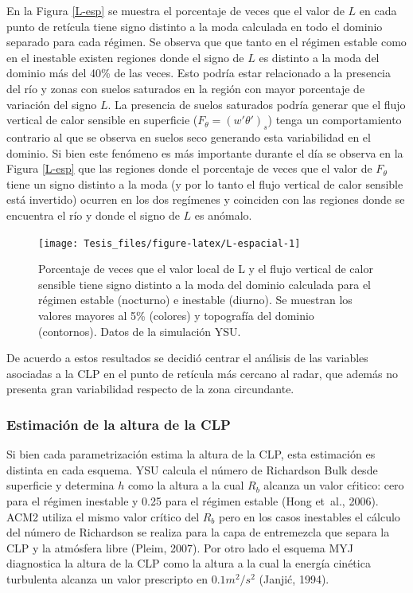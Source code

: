 \documentclass[12pt,spanish,oneside, a4paper]{book}
\begin{document}
En la Figura \ref{L-esp} se muestra el porcentaje de veces que el valor
de \(L\) en cada punto de retícula tiene signo distinto a la moda
calculada en todo el dominio separado para cada régimen. Se observa que
que tanto en el régimen estable como en el inestable existen regiones
donde el signo de \(L\) es distinto a la moda del dominio más del 40\%
de las veces. Esto podría estar relacionado a la presencia del río y
zonas con suelos saturados en la región con mayor porcentaje de
variación del signo \(L\). La presencia de suelos saturados podría
generar que el flujo vertical de calor sensible en superficie
(\(F_{\theta} = (w'\theta ')_s\)) tenga un comportamiento contrario al
que se observa en suelos seco generando esta variabilidad en el dominio.
Si bien este fenómeno es más importante durante el día se observa en la
Figura \ref{L-esp} que las regiones donde el porcentaje de veces que el
valor de \(F_{\theta}\) tiene un signo distinto a la moda (y por lo
tanto el flujo vertical de calor sensible está invertido) ocurren en los
dos regímenes y coinciden con las regiones donde se encuentra el río y
donde el signo de \(L\) es anómalo.

\begin{figure}

{\centering \texttt{[image: Tesis\_files/figure-latex/L-espacial-1]} 

}

\caption{Porcentaje de veces que el valor local de L y el flujo vertical de calor sensible tiene signo distinto a la moda del dominio calculada para el régimen estable (nocturno) e inestable (diurno). Se muestran los valores mayores al 5\% (colores) y topografía del dominio (contornos). Datos de la simulación YSU. \label{L-esp}}\label{fig:L-espacial}
\end{figure}

De acuerdo a estos resultados se decidió centrar el análisis de las
variables asociadas a la CLP en el punto de retícula más cercano al
radar, que además no presenta gran variabilidad respecto de la zona
circundante.

\subsubsection{Estimación de la altura de la
CLP}\label{estimacion-de-la-altura-de-la-clp}

Si bien cada parametrización estima la altura de la CLP, esta estimación
es distinta en cada esquema. YSU calcula el número de Richardson Bulk
desde superficie y determina \(h\) como la altura a la cual \(R_b\)
alcanza un valor cŕitico: cero para el régimen inestable y 0.25 para el
régimen estable (Hong et~al., 2006). ACM2 utiliza el mismo valor crítico
del \(R_b\) pero en los casos inestables el cálculo del número de
Richardson se realiza para la capa de entremezcla que separa la CLP y la
atmósfera libre (Pleim, 2007). Por otro lado el esquema MYJ diagnostica
la altura de la CLP como la altura a la cual la energía cinética
turbulenta alcanza un valor prescripto en \(0.1 m^2/s^2\) (Janjić,
1994).
\end{document}
